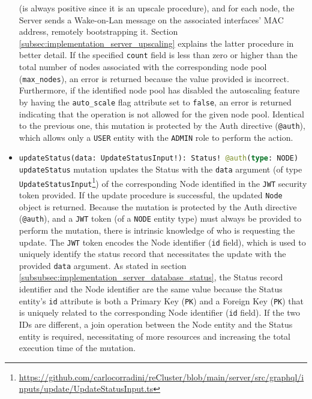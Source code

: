 \begin{itemize}
    (is always positive since it is an upscale procedure), and for each node, the
    Server sends a Wake-on-Lan message on the associated interfaces' MAC address,
    remotely bootstrapping it. Section
    \ref{subsec:implementation_server_upscaling} explains the latter procedure
    in better detail.
    \newline
    If the specified \texttt{count} field is less than zero or higher than the
    total number of nodes associated with the corresponding node pool (\texttt{max\_nodes}),
    an error is returned because the value provided is incorrect. Furthermore,
    if the identified node pool has disabled the autoscaling feature by having
    the \texttt{auto\_scale} flag attribute set to \texttt{false}, an error is returned
    indicating that the operation is not allowed for the given node pool.
    \newline
    Identical to the previous one, this mutation is protected by the Auth directive
    (\texttt{@auth}), which allows only a \texttt{USER} entity with the \texttt{ADMIN}
    role to perform the action.

  \item \lstinline[language=graphql, deletekeywords={type}, morekeywords={[2]{Status, UpdateStatusInput, @auth}},
    morekeywords={[3]{NODE}}, morekeywords={[4]{data, type}}, morekeywords={[5]{updateStatus}}]{updateStatus(data: UpdateStatusInput!): Status! @auth(type: NODE)}
    \newline
    \texttt{updateStatus} mutation updates the Status with the \texttt{data}
    argument (of type \texttt{UpdateStatusInput}\footnote{\url{https://github.com/carlocorradini/reCluster/blob/main/server/src/graphql/inputs/update/UpdateStatusInput.ts}})
    of the corresponding Node identified in the \texttt{JWT} security token
    provided. If the update procedure is successful, the updated \texttt{Node} object
    is returned.
    \newline
    Because the mutation is protected by the Auth directive (\texttt{@auth}),
    and a \texttt{JWT} token (of a \texttt{NODE} entity type) must always be
    provided to perform the mutation, there is intrinsic knowledge of who is requesting
    the update. The \texttt{JWT} token encodes the Node identifier (\texttt{id} field),
    which is used to uniquely identify the status record that necessitates the update
    with the provided \texttt{data} argument. As stated in section \ref{subsubsec:implementation_server_database_status},
    the Status record identifier and the Node identifier are the same value
    because the Status entity's \texttt{id} attribute is both a Primary Key (\texttt{PK})
    and a Foreign Key (\texttt{PK}) that is uniquely related to the corresponding
    Node identifier (\texttt{id} field). If the two IDs are different, a join
    operation between the Node entity and the Status entity is required, necessitating
    of more resources and increasing the total execution time of the mutation.


\end{itemize}
